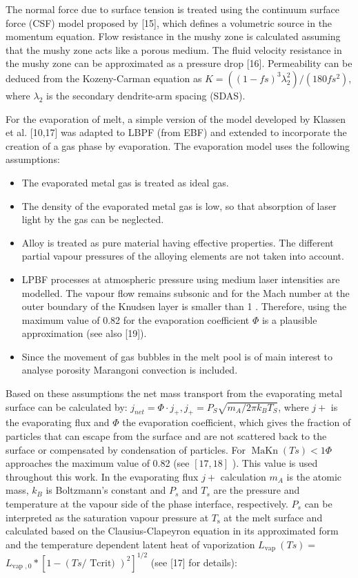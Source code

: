 \documentclass[10pt]{article}
\begin{document}
The normal force due to surface tension is treated using the continuum surface force (CSF) model proposed by [15], which defines a volumetric source in the momentum equation. Flow resistance in the mushy zone is calculated assuming that the mushy zone acts like a porous medium. The fluid velocity resistance in the mushy zone can be approximated as a pressure drop [16]. Permeability can be deduced from the Kozeny-Carman equation as $K=\left((1-f s)^{3} \lambda_{2}^{2}\right) /\left(180 f s^{2}\right)$, where $\lambda_{2}$ is the secondary dendrite-arm spacing (SDAS).

For the evaporation of melt, a simple version of the model developed by Klassen et al. [10,17] was adapted to LBPF (from EBF) and extended to incorporate the creation of a gas phase by evaporation. The evaporation model uses the following assumptions:

\begin{itemize}
  \item The evaporated metal gas is treated as ideal gas.
  \item The density of the evaporated metal gas is low, so that absorption of laser light by the gas can be neglected.
  \item Alloy is treated as pure material having effective properties. The different partial vapour pressures of the alloying elements are not taken into account.
  \item LPBF processes at atmospheric pressure using medium laser intensities are modelled. The vapour flow remains subsonic and for the Mach number at the outer boundary of the Knudsen layer is smaller than 1 . Therefore, using the maximum value of 0.82 for the evaporation coefficient $\Phi$ is a plausible approximation (see also [19]).
  \item Since the movement of gas bubbles in the melt pool is of main interest to analyse porosity Marangoni convection is included.
\end{itemize}

Based on these assumptions the net mass transport from the evaporating metal surface can be calculated by: $j_{n e t}=\Phi \cdot j_{+}, j_{+}=P_{S} \sqrt{m_{A} / 2 \pi k_{B} T_{S}}$, where $j+$ is the evaporating flux and $\Phi$ the evaporation coefficient, which gives the fraction of particles that can escape from the surface and are not scattered back to the surface or compensated by condensation of particles. For $\operatorname{MaKn}(T s)<1 \Phi$ approaches the maximum value of 0.82 (see $[17,18]$ ). This value is used throughout this work. In the evaporating flux $j+$ calculation $m_{A}$ is the atomic mass, $k_{B}$ is Boltzmann's constant and $P_{s}$ and $T_{s}$ are the pressure and temperature at the vapour side of the phase interface, respectively. $P_{s}$ can be interpreted as the saturation vapour pressure at $T_{\mathrm{s}}$ at the melt surface and calculated based on the Clausius-Clapeyron equation in its approximated form and the temperature dependent latent heat of vaporization $L_{\text {vap }}(T s)=$ $L_{\text {vap }, 0} *\left[1-(T s / \text { Tcrit) })^{2}\right]^{1 / 2}$ (see [17] for details):
\end{document}
